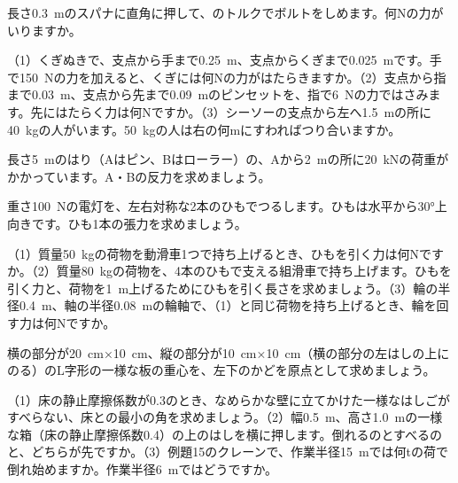 \bkendproblems
{}

\bkproblem 長さ\qty{0.3}{m}のスパナに直角に押して、のトルクでボルトをしめます。何Nの力がいりますか。

\bkproblem （1）くぎぬきで、支点から手まで\qty{0.25}{m}、支点からくぎまで\qty{0.025}{m}です。手で\qty{150}{N}の力を加えると、くぎには何Nの力がはたらきますか。（2）支点から指まで\qty{0.03}{m}、支点から先まで\qty{0.09}{m}のピンセットを、指で\qty{6}{N}の力ではさみます。先にはたらく力は何Nですか。（3）シーソーの支点から左へ\qty{1.5}{m}の所に\qty{40}{kg}の人がいます。\qty{50}{kg}の人は右の何mにすわればつり合いますか。

\bkproblem 長さ\qty{5}{m}のはり（Aはピン、Bはローラー）の、Aから\qty{2}{m}の所に\qty{20}{kN}の荷重がかかっています。A・Bの反力を求めましょう。

\bkproblem 重さ\qty{100}{N}の電灯を、左右対称な2本のひもでつるします。ひもは水平から30°上向きです。ひも1本の張力を求めましょう。

\bkproblem （1）質量\qty{50}{kg}の荷物を動滑車1つで持ち上げるとき、ひもを引く力は何Nですか。（2）質量\qty{80}{kg}の荷物を、4本のひもで支える組滑車で持ち上げます。ひもを引く力と、荷物を\qty{1}{m}上げるためにひもを引く長さを求めましょう。（3）輪の半径\qty{0.4}{m}、軸の半径\qty{0.08}{m}の輪軸で、（1）と同じ荷物を持ち上げるとき、輪を回す力は何Nですか。

\bkproblem 横の部分が\qty{20}{cm}×\qty{10}{cm}、縦の部分が\qty{10}{cm}×\qty{10}{cm}（横の部分の左はしの上にのる）のL字形の一様な板の重心を、左下のかどを原点として求めましょう。

\bkproblem （1）床の静止摩擦係数が0.3のとき、なめらかな壁に立てかけた一様なはしごがすべらない、床との最小の角を求めましょう。（2）幅\qty{0.5}{m}、高さ\qty{1.0}{m}の一様な箱（床の静止摩擦係数0.4）の上のはしを横に押します。倒れるのとすべるのと、どちらが先ですか。（3）例題15のクレーンで、作業半径\qty{15}{m}では何tの荷で倒れ始めますか。作業半径\qty{6}{m}ではどうですか。

